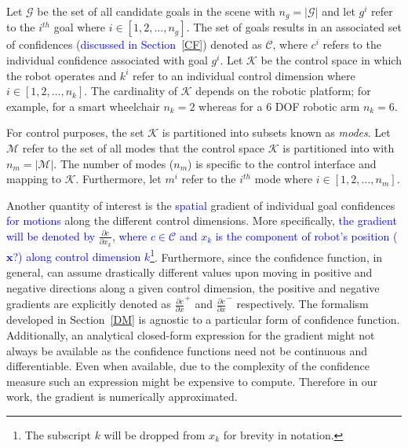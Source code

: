 \documentclass[conference]{IEEEtran}
\begin{document}
Let $\mathcal{G}$ be the set of all candidate goals in the scene with $n_g = \vert\mathcal{G}\vert$ and let $g^{i}$ refer to the $i^{th}$ goal where $i \in [1,2,\dots,n_g]$. The set of goals results in an associated set of confidences (\textcolor{blue}{discussed in Section~\ref{CF}}) denoted as $\mathcal{C}$, where $c^{i}$ refers to the individual confidence associated with goal $g^{i}$. Let $\mathcal{K}$ be the control space in which the robot operates and $k^{i}$ refer to an individual control dimension where $i \in [1,2,\dots,n_k]$.  The cardinality of $\mathcal{K}$ depends on the robotic platform; for example, for a smart wheelchair $n_k = 2$ whereas for a 6 DOF robotic arm $n_k = 6$.

For control purposes, the set $\mathcal{K}$ is partitioned into subsets known as \textit{modes}. Let $\mathcal{M}$ refer to the set of all modes that the control space $\mathcal{K}$ is partitioned into with $n_{m} = \vert\mathcal{M}\vert$. The number of modes ($n_{m}$) is specific to the control interface and mapping to $\mathcal{K}$. Furthermore, let $m^{i}$ refer to the $i^{th}$ mode where $i \in [1,2,\dots,n_{m}]$.

Another quantity of interest is the \textcolor{blue}{spatial} gradient of individual goal confidences \textcolor{blue}{for motions} along the different control dimensions. More specifically, \textcolor{blue}{the gradient will be denoted by} $\frac{\partial c}{\partial x_k}$, \textcolor{blue}{where $c \in \mathcal{C}$ and $x_k$ is the component of robot's position ($\boldsymbol{x}$?) along control dimension $k$\footnote{The subscript $k$ will be dropped from $x_k$ for brevity in notation.}}. Furthermore, since the confidence function, in general, can assume drastically different values upon moving in positive and negative directions along a  given control dimension, the positive and negative gradients are explicitly denoted as $\frac{\partial c}{\partial x}^{+}$ and $\frac{\partial c}{\partial x}^{-}$ respectively. The formalism developed in Section~\ref{DM} is agnostic to a particular form of confidence function. Additionally, an analytical closed-form expression for the gradient might not always be available as the confidence functions need not be continuous and differentiable. Even when available, due to the complexity of the confidence measure such an expression might be expensive to compute. Therefore in our work, the gradient is numerically approximated.
\end{document}
